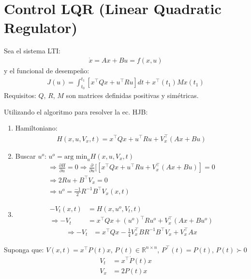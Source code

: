 \section{Control LQR (Linear Quadratic Regulator)}
Sea el sistema LTI:
\begin{align*}
    \dot{x}=Ax+Bu=f(x,u)
\end{align*}
y el funcional de desempeño:
\begin{align*}
    J(u)=\int_{t_0}^{t_1}[x^\top Q x+u^\top Ru]dt+x^\top(t_1)Mx(t_1)
\end{align*}
Requisitos: $Q$, $R$, $M$ son matrices definidas positivas y simétricas.\\
\par Utilizando el algoritmo para resolver la ec. HJB:
\begin{enumerate}
    \item[1.] Hamiltoniano:
    \begin{align*}
        H(x,u,V_x,t)=x^\top Qx+u^\top Ru+V^\top_x(Ax+Bu)
    \end{align*}
    \item[3.] Buscar $u^o$: $u^o=\text{arg min}_u H(x,u,V_x,t)$
    \begin{align*}
        \Longrightarrow \frac{\partial H}{\partial u}=0 \Longrightarrow \frac{\partial}{\partial u}[[x^\top Q x+u^\top Ru +V_x^\top(Ax+Bu)]=0\\
        \Longrightarrow 2Ru+B^\top V_x=0\\
        \Longrightarrow u^o=\frac{-1}{2}R^{-1}B^\top V_x(x,t)
    \end{align*}
    \item[2. y 4.] \begin{align*}
        -V_t(x,t) &= H(x,u^o,V_t,t)\\
        \Longrightarrow -V_t &= x^\top Qx+(u^o)^\top Ru^o+V_x^\top (Ax+Bu^o)
    \end{align*} 
    \begin{align}
        \Longrightarrow -V_t &= x^\top Qx-\frac{1}{4}V_x^\top BR^{-1}B^\top V_x+V_x^\top Ax
    \end{align}
\end{enumerate}

Suponga que: $V(x,t)=x^\top P(t)x$, $P(t)\in \mathbb{R}^{n\times n}$, $P^\top (t)=P(t)$, $P(t)\succ 0$
\begin{align*}
    V_t &= x^\top \dot{P}(t)x\\
    V_x &= 2P(t)x
\end{align*}

